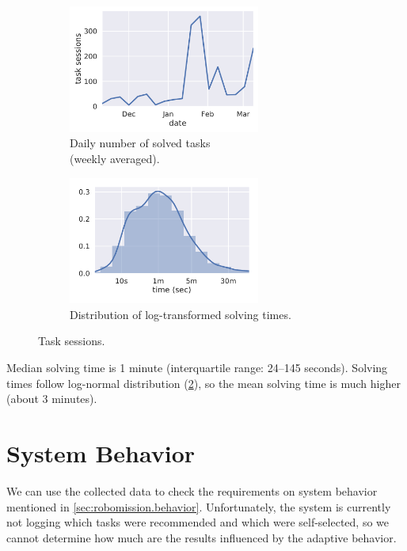 \begin{figure}[htb]
\centering
\begin{subfigure}{.49\textwidth}
\centering
\includegraphics[height=42mm]{img/daily-task-sessions}
\caption{Daily number of solved tasks\\(weekly averaged).}
\label{fig:solved-count}
\end{subfigure}
\begin{subfigure}{.49\textwidth}
\centering
\includegraphics[height=42mm]{img/task-sessions-time-log}
\caption{Distribution of log-transformed solving times.}
\label{fig:solving-times-all}
\end{subfigure}
\caption{Task sessions.}
\label{fig:daily-task-sessions}
\end{figure}

Median solving time is 1 minute (interquartile range: 24--145 seconds).
Solving times follow log-normal distribution (\cref{fig:solving-times-all}),
so the mean solving time is much higher
(about 3 minutes). %


\section{System Behavior}

We can use the collected data to check the requirements on system behavior mentioned in
\cref{sec:robomission.behavior}. Unfortunately, the system is currently not logging
which tasks were recommended and which were self-selected, so we cannot determine
how much are the results influenced by the adaptive behavior. %

